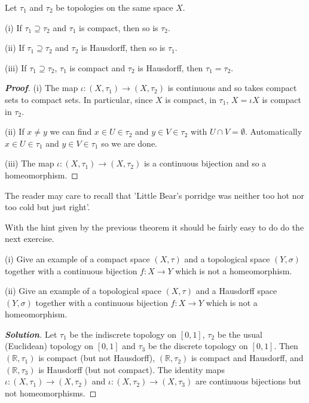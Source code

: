 \begin{theorem}\label{T;compare topologies}
Let $\tau_{1}$ and $\tau_{2}$ be topologies
on the same space $X$.

(i) If $\tau_{1}\supseteq \tau_{2}$ and $\tau_{1}$ is compact,
then so is $\tau_{2}$.

(ii) If $\tau_{1}\supseteq \tau_{2}$ and $\tau_{2}$ is Hausdorff,
then so is $\tau_{1}$.

(iii) If $\tau_{1}\supseteq \tau_{2}$, $\tau_{1}$ is compact
and $\tau_{2}$ is Hausdorff, then $\tau_{1}=\tau_{2}$.
\end{theorem}
\begin{proof}[\bf Proof] (i) The map $\iota:(X,{\tau}_{1})\rightarrow(X,{\tau}_{2})$
is continuous and so takes compact sets to compact sets. In particular,
since $X$ is compact, in $\tau_{1}$, $X=\iota X$ is compact in $\tau_{2}$.

(ii) If $x\neq y$ we can find $x\in U\in\tau_{2}$ and $y\in V\in\tau_{2}$
with $U\cap V=\emptyset$. Automatically
$x\in U\in\tau_{1}$ and $y\in V\in\tau_{1}$ so we are done.

(iii) The map $\iota:(X,{\tau}_{1})\rightarrow(X,{\tau}_{2})$
is a continuous bijection and so a homeomorphism.
\end{proof}


The reader may care to
recall that 'Little Bear's porridge was neither too hot nor
too cold but just right'.

With the hint given by the previous theorem it should
be fairly easy to do do the next exercise.


\begin{theorem}\label{T;too hot}
(i) Give an example of a compact space $(X,\tau)$ and
a topological space $(Y,\sigma)$
together with a continuous bijection $f:X\rightarrow Y$
which is not a homeomorphism.

(ii) Give an example of a topological space $(X,\tau)$ and
a Hausdorff space $(Y,\sigma)$
together with a continuous bijection $f:X\rightarrow Y$
which is not a homeomorphism.
\end{theorem}
\begin{proof}[\bf Solution] Let $\tau_{1}$ be the
indiscrete topology on $[0,1]$,
$\tau_{2}$ be the usual (Euclidean) topology on $[0,1]$
and $\tau_{3}$ be the discrete topology on $[0,1]$.
Then $({\mathbb R},\tau_{1})$ is compact (but not Hausdorff),
$({\mathbb R},\tau_{2})$ is compact and Hausdorff,
and $({\mathbb R},\tau_{3})$ is Hausdorff (but not compact).
The identity maps $\iota:(X,\tau_{1})\rightarrow(X,\tau_{2})$
and $\iota:(X,\tau_{2})\rightarrow(X,\tau_{3})$ are continuous
bijections but not homeomorphisms.
\end{proof}


